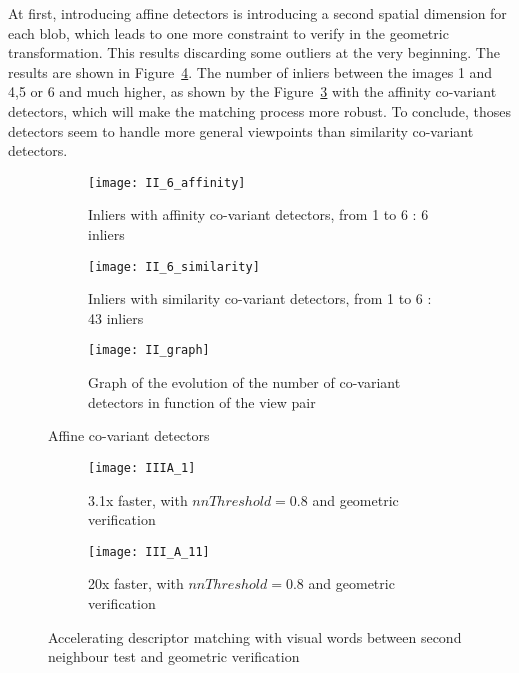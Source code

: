 \documentclass{article}
\begin{document}
At first, introducing affine detectors is introducing a second spatial dimension for each blob, which leads to one more constraint to verify in the geometric transformation. This results discarding some outliers at the very beginning.
The results are shown in Figure~\ref{fig:II}. The number of inliers between the images 1 and 4,5 or 6 and much higher, as shown by the Figure~\ref{fig:II_3} with the affinity co-variant detectors, which will make the matching process more robust. To conclude, thoses detectors seem to handle more general viewpoints than similarity co-variant detectors.

\begin{figure}[H]
	\centering
	\begin{subfigure}[b]{0.9\textwidth}
		\centering
		\texttt{[image: II\_6\_affinity]}
		\caption{Inliers with affinity co-variant detectors, from 1 to 6 : 6 inliers}
		\label{fig:II_1}
	\end{subfigure}

	\begin{subfigure}[b]{0.9\textwidth}
		\centering
		\texttt{[image: II\_6\_similarity]}
		\caption{Inliers with similarity co-variant detectors, from 1 to 6 : 43 inliers}
		\label{fig:II_2}
	\end{subfigure}

	\begin{subfigure}[b]{0.9\textwidth}
		\centering
		\texttt{[image: II\_graph]}
		\caption{Graph of the evolution of the number of co-variant detectors in function of the view pair}
		\label{fig:II_3}
	\end{subfigure}

	\caption{Affine co-variant detectors}
	\label{fig:II}
\end{figure}



\begin{figure}[ht!]
	\begin{subfigure}[b]{0.9\textwidth}
		\centering
		\texttt{[image: IIIA\_1]}
		\caption{3.1x faster, with \( nnThreshold = 0.8\) and geometric verification}
		\label{fig:III_A1}
	\end{subfigure}

	\begin{subfigure}[b]{0.9\textwidth}
		\centering
		\texttt{[image: III\_A\_11]}
		\caption{20x faster, with \( nnThreshold = 0.8\) and geometric verification}
		\label{fig:III_A11}
	\end{subfigure}

	\caption{Accelerating descriptor matching with visual words between second neighbour test and geometric verification}
	\label{fig:III_A}
\end{figure}
\end{document}
